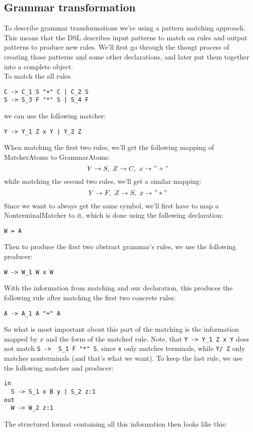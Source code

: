 \documentclass[a4paper]{article}
\begin{document}
\subsection*{Grammar transformation}
To describe grammar transformations we're using a pattern matching approach. This means that the DSL describes input patterns to match on rules and output patterns to produce new rules. We'll first go through the thougt process of creating those patterns and some other declarations, and later put them together into a complete object.\\
To match the all rules 
\begin{lstlisting}[language=grammar]
C -> C_1 S "+" C | C_2 S
S -> S_3 F "*" S | S_4 F
\end{lstlisting}
we can use the following matcher:
\lstset{language=transformer}
\begin{lstlisting}
Y -> Y_1 Z x Y | Y_2 Z
\end{lstlisting}
When matching the first two rules, we'll get the following mapping of MatcherAtoms to GrammarAtoms:
$$Y\to S, ~Z\to C, ~x\to "+"$$
while matching the second two rules, we'll get a similar mapping: 
$$Y\to F, ~Z\to S, ~x\to "*"$$
Since we want to always get the same symbol, we'll first have to map a NonterminalMatcher to it, which is done using the following declaration:
\begin{lstlisting}
W = A
\end{lstlisting}
Then to produce the first two abstract grammar's rules, we use the following producer:
\begin{lstlisting}
W -> W_1 W x W
\end{lstlisting}
With the information from matching and our declaration, this produces the following rule after matching the first two concrete rules:
\begin{lstlisting}[language=grammar]
A -> A_1 A "+" A
\end{lstlisting}
So what is most important about this part of the matching is the information mapped by $x$ and the form of the matched rule. Note, that \lstinline{Y -> Y_1 Z x Y} does not match \lstinline[language=grammar]{S ->  S_1 F "*" S}, since \lstinline{x} only matches terminals, while \lstinline{Y/ Z} only matches nonterminals (and that's what we want). To keep the last rule, we use the following matcher and producer:
\begin{lstlisting}
in
  S -> S_1 x B y | S_2 z:1
out
  W -> W_2 z:1
\end{lstlisting}
The structured format containing all this information then looks like this:
\end{document}
